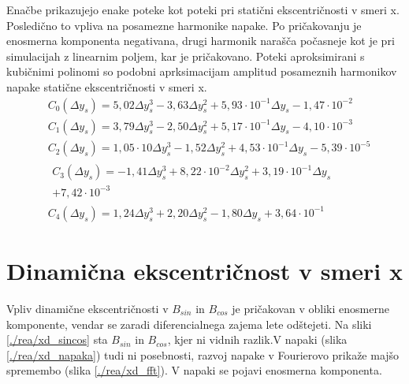 Enačbe prikazujejo enake poteke kot poteki pri statični ekscentričnosti v smeri x.
Posledično to vpliva na posamezne harmonike napake. Po pričakovanju je enosmerna komponenta negativana, drugi harmonik narašča počasneje kot je pri simulacijah z linearnim poljem, kar je pričakovano. Poteki aproksimirani s kubičnimi polinomi so podobni aprksimacijam amplitud posameznih harmonikov napake statične ekscentričnosti v smeri x.
\begin{eqnarray}
&C_0(\Delta y_s) =5,02\Delta y_s^{3}-3,63\Delta y_s^{2}+5,93\cdot 10^{-1}\Delta y_s-1,47\cdot 10^{-2} \\              
&C_1(\Delta y_s) =3,79\Delta y_s^{3}-2,50\Delta y_s^{2}+5,17\cdot 10^{-1}\Delta y_s-4,10\cdot 10^{-3} \\              
&C_2(\Delta y_s) =1,05\cdot 10\Delta y_s^{3}-1,52\Delta y_s^{2}+4,53\cdot 10^{-1}\Delta y_s-5,39\cdot 10^{-5} \\      
&\begin{split}C_3(\Delta y_s) =-1,41\Delta y_s^{3}+8,22\cdot 10^{-2}\Delta y_s^{2}+3,19\cdot 10^{-1}\Delta y_s\\+7,42\cdot 10^{-3} \end{split}\\
&C_4(\Delta y_s) =1,24\Delta y_s^{3}+2,20\Delta y_s^{2}-1,80\Delta y_s+3,64\cdot 10^{-1}     
\end{eqnarray}
\section{Dinamična ekscentričnost v smeri x}
Vpliv dinamične ekscentričnosti v $B_{sin}$ in $B_{cos}$ je pričakovan v obliki enosmerne komponente, vendar se zaradi diferencialnega zajema lete odštejeti. Na sliki  \ref{./rea/xd_sincos} sta $B_{sin}$ in $B_{cos}$, kjer ni vidnih razlik.V napaki (slika \ref{./rea/xd_napaka})  tudi ni posebnosti, razvoj napake v Fourierovo prikaže majšo spremembo (slika \ref{./rea/xd_fft}). V napaki se pojavi enosmerna komponenta.
\newpage
